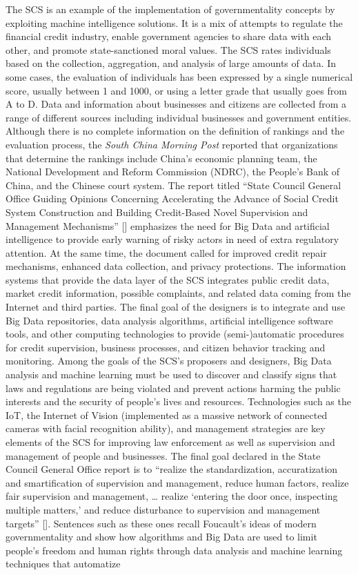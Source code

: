The SCS is an example of the implementation of governmentality concepts by exploiting machine intelligence solutions. It is a mix of attempts to regulate the financial credit industry, enable government agencies to share data with each other, and promote state-sanctioned moral values. The SCS rates individuals based on the collection, aggregation, and analysis of large amounts of data. In some cases, the evaluation of individuals has been expressed by a single numerical score, usually between 1 and 1000, or using a letter grade that usually goes from A to D. Data and information about businesses and citizens are collected from a range of different sources including individual businesses and government entities. Although there is no complete information on the definition of rankings and the evaluation process, the \textit{South China Morning Post} reported that organizations that determine the rankings include China's economic planning team, the National Development and Reform Commission (NDRC), the People's Bank of China, and the Chinese court system. The report titled ``State Council General Office Guiding Opinions Concerning Accelerating the Advance of Social Credit System Construction and Building Credit-Based Novel Supervision and Management Mechanisms'' [\citealt{chap:9:StateCouncilGeneralOffice:2019}] emphasizes the need for Big Data and artificial intelligence to provide early warning of risky actors in need of extra regulatory attention. At the same time, the document called for improved credit repair mechanisms, enhanced data collection, and privacy protections. The information systems that provide the data layer of the SCS integrates public credit data, market credit information, possible complaints, and related data coming from the Internet and third parties. The final goal of the designers is to integrate and use Big Data repositories, data analysis algorithms, artificial intelligence software tools, and other computing technologies to provide (semi-)automatic procedures for credit supervision, business processes, and citizen behavior tracking and monitoring. Among the goals of the SCS's proposers and designers, Big Data analysis and machine learning must be used to discover and classify signs that laws and regulations are being violated and prevent actions harming the public interests and the security of people's lives and resources. Technologies such as the IoT, the Internet of Vision (implemented as a massive network of connected cameras with facial recognition ability), and management strategies are key elements of the SCS for improving law enforcement as well as supervision and management of people and businesses. The final goal declared in the State Council General Office report is to ``realize the standardization, accuratization and smartification of supervision and management, reduce human factors, realize fair supervision and management, {\dots} realize `entering the door once, inspecting multiple matters,' and reduce disturbance to supervision and management targets'' [\citealt{chap:9:StateCouncilGeneralOffice:2019}]. Sentences such as these ones recall Foucault's ideas of modern governmentality and show how algorithms and Big Data are used to limit people's freedom and human rights through data analysis and machine learning techniques that automatize 